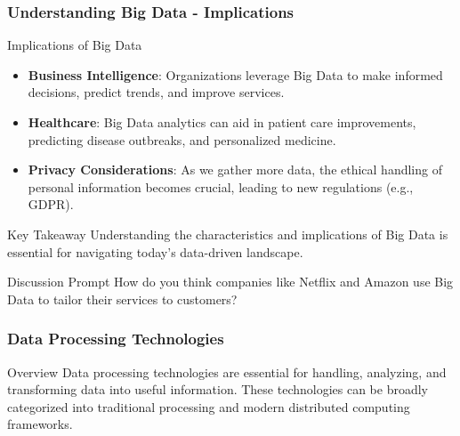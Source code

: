 \documentclass[aspectratio=169]{beamer}
\begin{document}
\begin{frame}[fragile]
    \frametitle{Understanding Big Data - Implications}
    \begin{block}{Implications of Big Data}
        \begin{itemize}
            \item \textbf{Business Intelligence}: Organizations leverage Big Data to make informed decisions, predict trends, and improve services.
            \item \textbf{Healthcare}: Big Data analytics can aid in patient care improvements, predicting disease outbreaks, and personalized medicine.
            \item \textbf{Privacy Considerations}: As we gather more data, the ethical handling of personal information becomes crucial, leading to new regulations (e.g., GDPR).
        \end{itemize}
    \end{block}
    \begin{block}{Key Takeaway}
        Understanding the characteristics and implications of Big Data is essential for navigating today’s data-driven landscape.
    \end{block}
    \begin{block}{Discussion Prompt}
        How do you think companies like Netflix and Amazon use Big Data to tailor their services to customers?
    \end{block}
\end{frame}

\begin{frame}[fragile]
    \frametitle{Data Processing Technologies}
    \begin{block}{Overview}
        Data processing technologies are essential for handling, analyzing, and transforming data into useful information. 
        These technologies can be broadly categorized into traditional processing and modern distributed computing frameworks.
    \end{block}
\end{frame}
\end{document}
